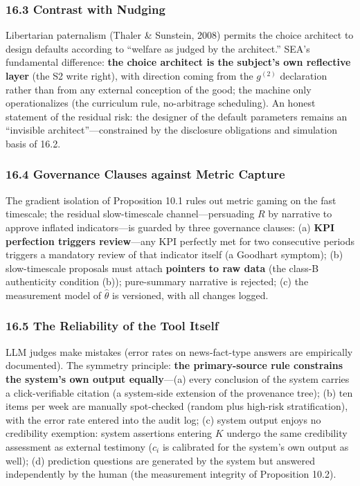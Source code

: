 \documentclass[
  11pt]{article}
\begin{document}
\subsubsection{16.3 Contrast with Nudging}\label{contrast-with-nudging}

Libertarian paternalism (Thaler \& Sunstein, 2008) permits the choice
architect to design defaults according to ``welfare as judged by the
architect.'' SEA's fundamental difference: \textbf{the choice architect
is the subject's own reflective layer} (the S2 write right), with
direction coming from the \(g^{(2)}\) declaration rather than from any
external conception of the good; the machine only operationalizes (the
curriculum rule, no-arbitrage scheduling). An honest statement of the
residual risk: the designer of the default parameters remains an
``invisible architect''---constrained by the disclosure obligations and
simulation basis of 16.2.

\subsubsection{16.4 Governance Clauses against Metric
Capture}\label{governance-clauses-against-metric-capture}

The gradient isolation of Proposition 10.1 rules out metric gaming on
the fast timescale; the residual slow-timescale channel---persuading
\(R\) by narrative to approve inflated indicators---is guarded by three
governance clauses: (a) \textbf{KPI perfection triggers review}---any
KPI perfectly met for two consecutive periods triggers a mandatory
review of that indicator itself (a Goodhart symptom); (b) slow-timescale
proposals must attach \textbf{pointers to raw data} (the class-B
authenticity condition (b)); pure-summary narrative is rejected; (c) the
measurement model of \(\hat\theta\) is versioned, with all changes
logged.

\subsubsection{16.5 The Reliability of the Tool
Itself}\label{the-reliability-of-the-tool-itself}

LLM judges make mistakes (error rates on news-fact-type answers are
empirically documented). The symmetry principle: \textbf{the
primary-source rule constrains the system's own output equally}---(a)
every conclusion of the system carries a click-verifiable citation (a
system-side extension of the provenance tree); (b) ten items per week
are manually spot-checked (random plus high-risk stratification), with
the error rate entered into the audit log; (c) system output enjoys no
credibility exemption: system assertions entering \(K\) undergo the same
credibility assessment as external testimony (\(c_i\) is calibrated for
the system's own output as well); (d) prediction questions are generated
by the system but answered independently by the human (the measurement
integrity of Proposition 10.2).
\end{document}
